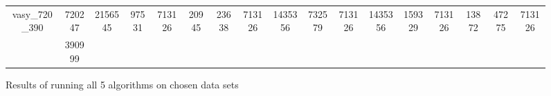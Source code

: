 \documentclass[../master/master.tex]{subfiles}
\begin{document}
\begin{figure}
\begin{adjustbox}{angle=90}
\begin{tabular}{ |c|c||c|c|c||c|c|c||c|c|c||c|c|c||c|c|c| }
\hline
\multirow{2}{3.6em}{vasy\_720\_390} & 720247 & \multirow{2}{3.6em}{2156545} & \multirow{2}{3.6em}{97531 } & \multirow{2}{3.6em}{713126} & \multirow{2}{3.6em}{20945} & \multirow{2}{3.6em}{23638 } & \multirow{2}{3.6em}{713126} & \multirow{2}{3.6em}{1435356} & \multirow{2}{3.6em}{732579 } & \multirow{2}{3.6em}{713126} & \multirow{2}{3.6em}{1435356} & \multirow{2}{3.6em}{159329 } & \multirow{2}{3.6em}{713126} & \multirow{2}{3.6em}{13872} & \multirow{2}{3.6em}{47275 } & \multirow{2}{3.6em}{713126} \\
\cline{2-2}
 & 390999  &  &  &  &  &  &  &  &  &  &  &  &  &  &  &  \\
\hline
\end{tabular}
\end{adjustbox}
\caption{Results of running all 5 algorithms on chosen data sets}
\label{fig:data}
\end{figure}
\end{document}

